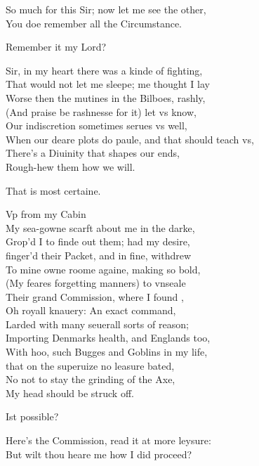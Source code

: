 \documentclass[a5paper,DIV=calc,11pt]{scrbook}
\begin{document}
\begin{drama*}
    \hamspeaks So much for this Sir; now let me see the other,\\
    You doe remember all the Circumstance.
    
    \horspeaks Remember it my Lord?
    
    \hamspeaks Sir, in my heart there was a kinde of fighting,\\
    That would not let me sleepe; me thought I lay\\
    Worse then the mutines in the Bilboes, rashly,\\
    (And praise be rashnesse for it) let vs know,\\
    Our indiscretion sometimes serues vs well,\\
    When our deare plots do paule, and that should teach vs,\\
    There's a Diuinity that shapes our ends,\\
    Rough-hew them how we will.
    
    \horspeaks That is most certaine.
    
    \hamspeaks Vp from my Cabin\\
    My sea-gowne scarft about me in the darke,\\
    Grop'd I to finde out them; had my desire,\\
    finger'd their Packet, and in fine, withdrew\\
    To mine owne roome againe, making so bold,\\
    (My feares forgetting manners) to vnseale\\
    Their grand Commission, where I found \hor,\\
    Oh royall knauery: An exact command,\\
    Larded with many seuerall sorts of reason;\\
    Importing Denmarks health, and Englands too,\\
    With hoo, such Bugges and Goblins in my life,\\
    that on the superuize no leasure bated,\\
    No not to stay the grinding of the Axe,\\
    My head should be struck off.
    
    \horspeaks Ist possible?
    
    \hamspeaks Here's the Commission, read it at more leysure:\\
    But wilt thou heare me how I did proceed?
    

\end{drama*}
\end{document}
